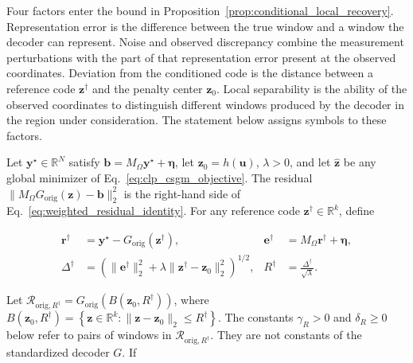 Four factors enter the bound in
Proposition~\ref{prop:conditional_local_recovery}. Representation error is
the difference between the true window and a window the decoder can
represent. Noise and observed discrepancy combine the measurement
perturbations with the part of that representation error present at the
observed coordinates. Deviation from the conditioned code is the distance
between a reference code $\boldsymbol{z}^{\dagger}$ and the penalty center
$\boldsymbol{z}_0$. Local separability is the ability of the observed
coordinates to distinguish different windows produced by the decoder in
the region under consideration. The statement below assigns symbols to
these factors.

\begin{proposition}
\label{prop:conditional_local_recovery}
Let
$\boldsymbol{y}^{\star}\in\mathbb{R}^{N}$ satisfy
$\boldsymbol{b}
=M_{\Omega}\boldsymbol{y}^{\star}+\boldsymbol{\eta}$, let
$\boldsymbol{z}_0=h(\boldsymbol{u})$, $\lambda>0$, and let
$\widehat{\boldsymbol{z}}$ be any global minimizer of
Eq.~\eqref{eq:clp_csgm_objective}. The residual
$\|M_{\Omega}G_{\mathrm{orig}}(\boldsymbol{z})-\boldsymbol{b}\|_2^2$
is the right-hand side of Eq.~\eqref{eq:weighted_residual_identity}.
For any reference code
$\boldsymbol{z}^{\dagger}\in\mathbb{R}^{k}$, define

\begin{equation}
\begin{aligned}
\boldsymbol{r}^{\dagger}
&=
\boldsymbol{y}^{\star}
-
G_{\mathrm{orig}}(\boldsymbol{z}^{\dagger}),
&
\boldsymbol{e}^{\dagger}
&=
M_{\Omega}\boldsymbol{r}^{\dagger}
+
\boldsymbol{\eta},
\\
\Delta^{\dagger}
&=
\left(
\|\boldsymbol{e}^{\dagger}\|_2^2
+
\lambda
\|\boldsymbol{z}^{\dagger}-\boldsymbol{z}_0\|_2^2
\right)^{1/2},
&
R^{\dagger}
&=
\frac{\Delta^{\dagger}}{\sqrt{\lambda}}.
\end{aligned}
\label{eq:local_recovery_quantities}
\end{equation}

Let
$\mathcal{R}_{\mathrm{orig},R^{\dagger}}
=
G_{\mathrm{orig}}(B(\boldsymbol{z}_0,R^{\dagger}))$, where
$B(\boldsymbol{z}_0,R^{\dagger})
=
\left\{
\boldsymbol{z}\in\mathbb{R}^{k}:
\|\boldsymbol{z}-\boldsymbol{z}_0\|_2
\leq R^{\dagger}
\right\}$.
The constants $\gamma_R>0$ and $\delta_R\geq0$ below refer to pairs of
windows in $\mathcal{R}_{\mathrm{orig},R^{\dagger}}$. They are not constants of the
standardized decoder $G$. If


\end{proposition}
